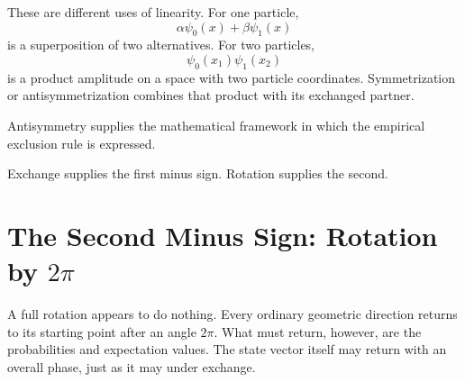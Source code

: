 These are different uses of linearity. For one particle,
\begin{equation}
\alpha\psi_0(x)+\beta\psi_1(x)
\end{equation}
is a superposition of two alternatives. For two particles,
\begin{equation}
\psi_0(x_1)\psi_1(x_2)
\end{equation}
is a product amplitude on a space with two particle coordinates. Symmetrization or antisymmetrization combines that product with its exchanged partner.

\begin{classroomqa}
\end{classroomqa}

\begin{classroomqa}
\end{classroomqa}

Antisymmetry supplies the mathematical framework in which the empirical exclusion rule is expressed.

\begin{classroomqa}
\end{classroomqa}

Exchange supplies the first minus sign. Rotation supplies the second.

\section{The Second Minus Sign: Rotation by \texorpdfstring{\(2\pi\)}{2 pi}}

A full rotation appears to do nothing. Every ordinary geometric direction returns to its starting point after an angle \(2\pi\). What must return, however, are the probabilities and expectation values. The state vector itself may return with an overall phase, just as it may under exchange.

